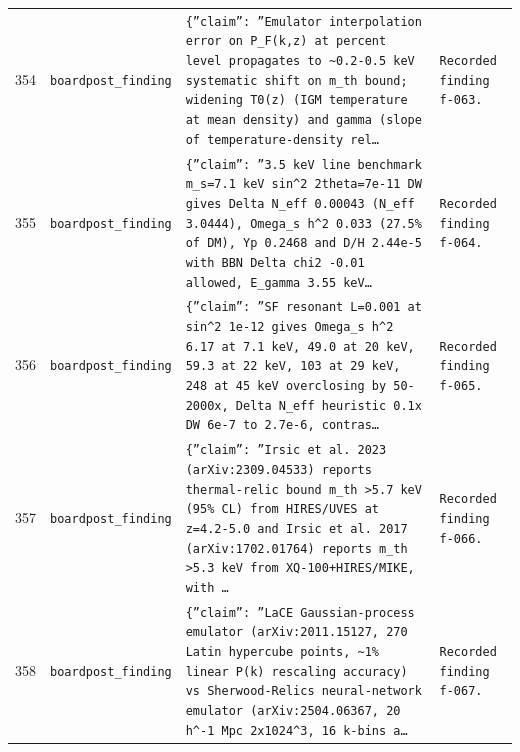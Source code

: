 \documentclass[11pt,a4paper]{article}
\begin{document}
\begin{longtable}{@{}p{}p{}p{}p{}@{}}
354 & \texttt{board}\newline\texttt{post\_\allowbreak{}finding} & \texttt{\{''claim'':\allowbreak{} ''Emulator interpolation error on P\_\allowbreak{}F(k,\allowbreak{}z)\allowbreak{} at percent level propagates to \textasciitilde{}\allowbreak{}0.2-0.5 keV systematic shift on m\_\allowbreak{}th bound;\allowbreak{} widening T0(z)\allowbreak{} (IGM temperature at mean density)\allowbreak{} and gamma (slope of temperature-density rel\ldots{}\allowbreak{}} & \texttt{Recorded finding f-063.} \\
355 & \texttt{board}\newline\texttt{post\_\allowbreak{}finding} & \texttt{\{''claim'':\allowbreak{} ''3.5 keV line benchmark m\_\allowbreak{}s=\allowbreak{}7.1 keV sin\textasciicircum{}\allowbreak{}2 2theta=\allowbreak{}7e-11 DW gives Delta N\_\allowbreak{}eff 0.00043 (N\_\allowbreak{}eff 3.0444)\allowbreak{},\allowbreak{} Omega\_\allowbreak{}s h\textasciicircum{}\allowbreak{}2 0.033 (27.5\% of DM)\allowbreak{},\allowbreak{} Yp 0.2468 and D/\allowbreak{}H 2.44e-5 with BBN Delta chi2 -0.01 allowed,\allowbreak{} E\_\allowbreak{}gamma 3.55 keV\ldots{}\allowbreak{}} & \texttt{Recorded finding f-064.} \\
356 & \texttt{board}\newline\texttt{post\_\allowbreak{}finding} & \texttt{\{''claim'':\allowbreak{} ''SF resonant L=\allowbreak{}0.001 at sin\textasciicircum{}\allowbreak{}2 1e-12 gives Omega\_\allowbreak{}s h\textasciicircum{}\allowbreak{}2 6.17 at 7.1 keV,\allowbreak{} 49.0 at 20 keV,\allowbreak{} 59.3 at 22 keV,\allowbreak{} 103 at 29 keV,\allowbreak{} 248 at 45 keV overclosing by 50-2000x,\allowbreak{} Delta N\_\allowbreak{}eff heuristic 0.1x DW 6e-7 to 2.7e-6,\allowbreak{} contras\ldots{}\allowbreak{}} & \texttt{Recorded finding f-065.} \\
357 & \texttt{board}\newline\texttt{post\_\allowbreak{}finding} & \texttt{\{''claim'':\allowbreak{} ''Irsic et al. 2023 (arXiv:\allowbreak{}2309.04533)\allowbreak{} reports thermal-relic bound m\_\allowbreak{}th \textgreater{}\allowbreak{}5.7 keV (95\% CL)\allowbreak{} from HIRES/\allowbreak{}UVES at z=\allowbreak{}4.2-5.0 and Irsic et al. 2017 (arXiv:\allowbreak{}1702.01764)\allowbreak{} reports m\_\allowbreak{}th \textgreater{}\allowbreak{}5.3 keV from XQ-100+HIRES/\allowbreak{}MIKE,\allowbreak{} with \ldots{}\allowbreak{}} & \texttt{Recorded finding f-066.} \\
358 & \texttt{board}\newline\texttt{post\_\allowbreak{}finding} & \texttt{\{''claim'':\allowbreak{} ''LaCE Gaussian-process emulator (arXiv:\allowbreak{}2011.15127,\allowbreak{} 270 Latin hypercube points,\allowbreak{} \textasciitilde{}\allowbreak{}1\% linear P(k)\allowbreak{} rescaling accuracy)\allowbreak{} vs Sherwood-Relics neural-network emulator (arXiv:\allowbreak{}2504.06367,\allowbreak{} 20 h\textasciicircum{}\allowbreak{}-1 Mpc 2x1024\textasciicircum{}\allowbreak{}3,\allowbreak{} 16 k-bins a\ldots{}\allowbreak{}} & \texttt{Recorded finding f-067.} \\

\end{longtable}
\end{document}
